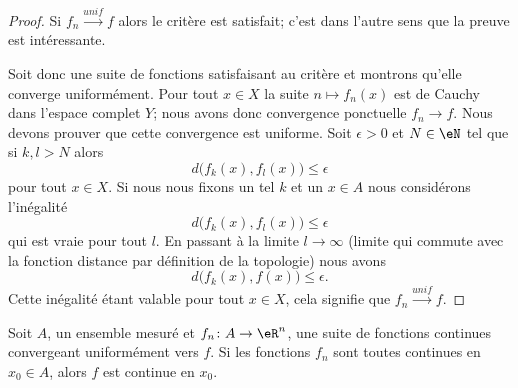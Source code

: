 \begin{proof}
	Si \( f_n\stackrel{unif}{\longrightarrow}f\) alors le critère est satisfait; c'est dans l'autre sens que la preuve est intéressante.

	Soit donc une suite de fonctions satisfaisant au critère et montrons qu'elle converge uniformément. Pour tout \( x\in X\) la suite \( n\mapsto f_n(x)\) est de Cauchy dans l'espace complet \( Y\); nous avons donc convergence ponctuelle \( f_n\to f\). Nous devons prouver que cette convergence est uniforme. Soit \( \epsilon>0\) et \( N\in \eN\) tel que si \( k,l>N\) alors
	\begin{equation}
		d\big( f_k(x),f_l(x) \big)\leq \epsilon
	\end{equation}
	pour tout \( x\in X\). Si nous nous fixons un tel \( k\) et un \( x\in A\) nous considérons l'inégalité
	\begin{equation}
		d\big( f_k(x),f_l(x) \big)\leq \epsilon
	\end{equation}
	qui est vraie pour tout \( l\). En passant à la limite \( l\to\infty\) (limite qui commute avec la fonction distance par définition de la topologie) nous avons
	\begin{equation}
		d\big( f_k(x),f(x) \big)\leq \epsilon.
	\end{equation}
	Cette inégalité étant valable pour tout \( x\in X\), cela signifie que \( f_n\stackrel{unif}{\longrightarrow}f\).
\end{proof}

\begin{theorem}			\label{ThoUnigCvCont}
	Soit \( A\), un ensemble mesuré et \( f_n\colon A\to \eR^n\), une suite de fonctions continues convergeant uniformément vers \( f\). Si les fonctions \( f_n\) sont toutes continues en \( x_0\in A\), alors \( f\) est continue en \( x_0\).
\end{theorem}

